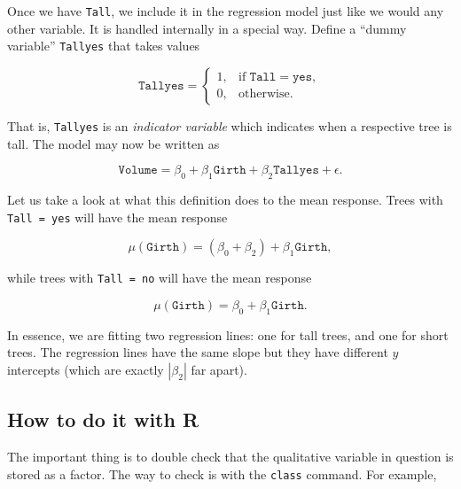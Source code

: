 \documentclass[]{book}
\newenvironment{Shaded}{\begin{snugshade}}{\end{snugshade}}
\newcommand{\KeywordTok}[1]{\textcolor[rgb]{0.13,0.29,0.53}{\textbf{{#1}}}}
\newcommand{\NormalTok}[1]{{#1}}
\numberwithin{equation}{chapter}
\numberwithin{figure}{chapter}
\theoremstyle{plain}
\theoremstyle{definition}
\theoremstyle{remark}
\theoremstyle{definition}
\theoremstyle{definition}
\theoremstyle{remark}
\begin{document}
Once we have \texttt{Tall}, we include it in the regression model just
like we would any other variable. It is handled internally in a special
way. Define a ``dummy variable'' \texttt{Tallyes} that takes values

\begin{equation} \mathtt{Tallyes} = \begin{cases} 1, & \mbox{if }\mathtt{Tall}=\mathtt{yes},\\ 0, & \mbox{otherwise.} \end{cases} \end{equation}

That is, \texttt{Tallyes} is an \emph{indicator variable} which
indicates when a respective tree is tall. The model may now be written
as

\begin{equation}
\mathtt{Volume}=\beta_{0}+\beta_{1}\mathtt{Girth}+\beta_{2}\mathtt{Tallyes}+\epsilon.
\end{equation}

Let us take a look at what this definition does to the mean response.
Trees with \texttt{Tall\ =\ yes} will have the mean response

\begin{equation}
\mu(\mathtt{Girth})=(\beta_{0}+\beta_{2})+\beta_{1}\mathtt{Girth},
\end{equation}

while trees with \texttt{Tall\ =\ no} will have the mean response

\begin{equation} 
\mu(\mathtt{Girth})=\beta_{0}+\beta_{1}\mathtt{Girth}.
\end{equation}

In essence, we are fitting two regression lines: one for tall trees, and
one for short trees. The regression lines have the same slope but they
have different \(y\) intercepts (which are exactly \(|\beta_{2}|\) far
apart).

\subsection{How to do it with R}\label{how-to-do-it-with-r-39}

The important thing is to double check that the qualitative variable in
question is stored as a factor. The way to check is with the
\texttt{class} command. For example,

\begin{Shaded}
\end{Shaded}
\end{document}
